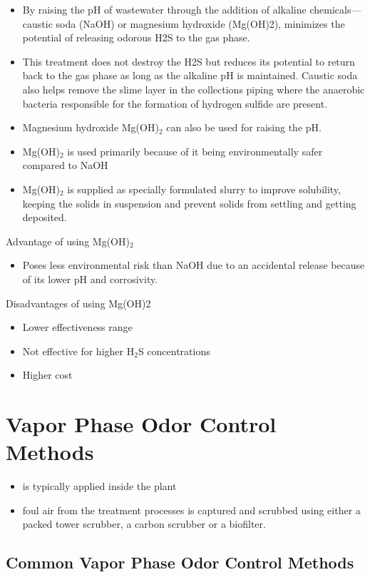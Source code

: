 \begin{itemize}
\item By raising the pH of wastewater through the addition of alkaline chemicals—caustic soda (NaOH)  or magnesium hydroxide (Mg(OH)2), minimizes the potential of releasing odorous H2S to the gas phase.
\item This treatment does not destroy the H2S but reduces its potential to return back to the gas phase as long as the alkaline pH is maintained.
Caustic soda also helps remove the slime layer in the collections piping where the anaerobic bacteria responsible for the formation of hydrogen sulfide are present.  

\item Magnesium hydroxide Mg(OH)$_2$ can also be used for raising the pH.
\item Mg(OH)$_2$ is used primarily because of it being environmentally safer compared to NaOH
\item Mg(OH)$_2$ is supplied as specially formulated slurry to improve solubility, keeping the solids in suspension and prevent solids from settling and getting deposited.
\end{itemize}


Advantage of using Mg(OH)$_2$
\begin{itemize}
\item Poses less environmental risk than NaOH due to an accidental release because of its lower pH and corrosivity.
\end{itemize}
Disadvantages of using Mg(OH)2
\begin{itemize}
\item Lower effectiveness range
\item Not effective for higher H$_2$S concentrations
\item Higher cost
\end{itemize}

\section{Vapor Phase Odor Control Methods}
\begin{itemize}
	\item is typically applied inside the plant
	\item foul air from the treatment processes is captured and scrubbed using either a packed tower scrubber, a carbon scrubber or a biofilter.
	\end{itemize}
\subsection{Common Vapor Phase Odor Control Methods}

